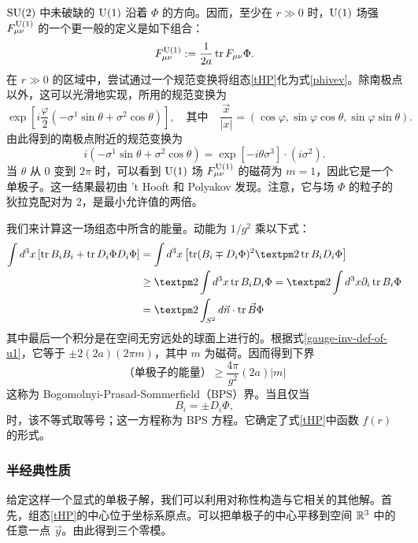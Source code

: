 $\mathop{\mathrm{SU}}(2)$ 中未破缺的 ${\mathrm{U}}(1)$ 沿着 $\Phi$ 的方向。因而，至少在 $r\gg 0$ 时，${\mathrm{U}}(1)$ 场强 $F_{\mu\nu}^{{\mathrm{U}}(1)}$ 的一个更一般的定义是如下组合：
\begin{equation}
F_{\mu\nu}^{{\mathrm{U}}(1)}:=\frac{1}{2a}\mathop{\mathrm{tr}}\nolimits F_{\mu\nu} \Phi .\label{gauge-inv-def-of-u1}
\end{equation}
在 $r\gg 0$ 的区域中，尝试通过一个规范变换将组态\eqref{tHP}化为式\eqref{phivev}。除南极点以外，这可以光滑地实现，所用的规范变换为
\begin{equation}
\exp[ i\frac{\varphi}{2} (-\sigma^1 \sin\theta + \sigma^2 \cos\theta )],\quad
\text{其中}\quad \frac{\vec x}{|x|}=(\cos\varphi,\sin\varphi\cos\theta,\sin\varphi\sin\theta).
\end{equation}
由此得到的南极点附近的规范变换为
\begin{equation}
i (-\sigma^1 \sin\theta + \sigma^2\cos\theta) =  \exp[ -i\theta \sigma^3 ] \cdot (i\sigma^2).
\end{equation}
当 $\theta$ 从 $0$ 变到 $2\pi$ 时，可以看到 ${\mathrm{U}}(1)$ 场 $F^{{\mathrm{U}}(1)}_{\mu\nu}$ 的磁荷为 $m=1$，因此它是一个单极子。这一结果最初由 't Hooft 和 Polyakov 发现。注意，它与场 $\Phi$ 的粒子的狄拉克配对为 2，是最小允许值的两倍。

我们来计算这一场组态中所含的能量。动能为 $1/g^2$ 乘以下式：
\begin{align}
\int d^3x \left[\tr B_{i} B_i + \tr D_i\Phi D_i\Phi \right]
&=\int d^3 x \left[ \tr(B_i\mp D_i\Phi)^2 \pm 2 \tr B_i D_i\Phi \right]\\
&\ge \pm 2 \int d^3 x  \tr B_i D_i\Phi = \pm 2 \int d^3 x \partial_i \tr B_i\Phi \\
&= \pm 2 \int_{S^2}  d\vec n \cdot \tr \vec B\Phi
\end{align}
其中最后一个积分是在空间无穷远处的球面上进行的。根据式\eqref{gauge-inv-def-of-u1}，它等于 $\pm 2(2a)(2\pi m)$，其中 $m$ 为磁荷。因而得到下界
\begin{equation}
\text{（单极子的能量）}\ge \frac{4\pi }{g^2} (2a) |m|  \label{monopole-energy}
\end{equation}
这称为 Bogomolnyi-Prasad-Sommerfield（BPS）界。当且仅当
\begin{equation}
B_i=\pm D_i\Phi,
\end{equation}
时，该不等式取等号；这一方程称为 BPS 方程。它确定了式\eqref{tHP}中函数 $f(r)$ 的形式。

\subsubsection{半经典性质}
给定这样一个显式的单极子解，我们可以利用对称性构造与它相关的其他解。首先，组态\eqref{tHP}的中心位于坐标系原点。可以把单极子的中心平移到空间 $\mathbb{R}^3$ 中的任意一点 $\vec y$。由此得到三个零模。

